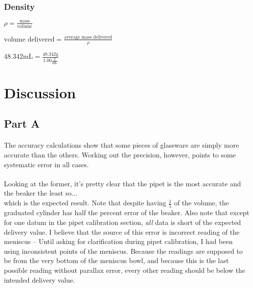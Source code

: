 \documentclass[fleqn,titlepage]{article}
\begin{document}
    \subsubsection*{Density}
      \begin{center}$\rho = \frac{\text{mass}}{\text{volume}}$\end{center}
      \begin{center}$\text{volume delivered} = \frac{\text{average mass delivered}}{\rho}$\end{center}
      \begin{center}$48.342\text{mL} = \frac{48.342\text{g}}{1.00 \frac{\text{g}}{\text{mL}}}$\end{center} 

\section*{Discussion}
  \subsection*{Part A}
    \paragraph{} The accuracy calculations show that some pieces of glassware are simply more accurate than the others. Working out the precision, however, points to some systematic error in all cases.

    \paragraph{} Looking at the former, it's pretty clear that the pipet is the most accurate and the beaker the least so...
     \\[0.2cm]
    which is the expected result. Note that despite having $\frac{1}{5}$ of the volume, the graduated cylinder has half the percent error of the beaker. Also note that except for one datum in the pipet calibration section, \emph{all} data is short of the expected delivery value. I believe that the source of this error is incorrect reading of the meniscus -- Until asking for clarification during pipet calibration, I had been using inconsistent points of the meniscus. Because the readings are supposed to be from the very bottom of the meniscus bowl, and because this is the last possible reading without parallax error, every other reading should be below the intended delivery value.
\end{document}
